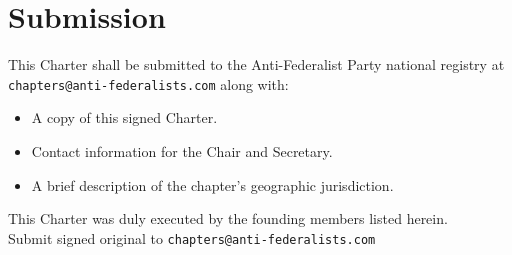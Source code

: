 \documentclass[11pt, letterpaper]{article}
\begin{document}
\section{Submission}

This Charter shall be submitted to the Anti-Federalist Party national registry at \texttt{chapters@anti-federalists.com} along with:

\begin{itemize}
  \item A copy of this signed Charter.
  \item Contact information for the Chair and Secretary.
  \item A brief description of the chapter's geographic jurisdiction.
\end{itemize}


\newpage


\vspace{2.5cm}




\vspace{2cm}

\begin{center}
  {\small\color{afp-gray}\sffamily
    This Charter was duly executed by the founding members listed herein.\\[0.5em]
    Submit signed original to \texttt{chapters@anti-federalists.com}
  }
\end{center}
\end{document}
